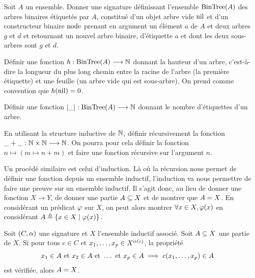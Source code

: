 \begin{exercise}
  Soit $A$ un ensemble. Donner une signature définissant l'ensemble
  $\operatorname{BinTree}(A)$ des arbres
  binaires étiquetés par $A$, constitué d'un objet arbre vide $\operatorname{nil}$ et d'un
  constructeur binaire $\operatorname{node}$ prenant en argument un élément $a$ de $A$
  et deux arbres $g$ et $d$ et retournant un nouvel arbre binaire, d'étiquette
  $a$ et dont les deux sous-arbres sont $g$ et $d$.

  Définir une fonction $h : \displaystyle \operatorname{BinTree}(A) \longrightarrow \mathbb N$ donnant la
  hauteur d'un arbre, c'est-à-dire la longueur du plus long chemin entre la
  racine de l'arbre (la première étiquette) et une feuille (un arbre vide qui
  est sous-arbre). On prend comme convention que $h(\operatorname{nil}) = 0$.

  Définir une fonction $\left\vert\mathord{\_}\right\vert : \displaystyle \operatorname{BinTree}(A) \longrightarrow \mathbb N$ donnant
  le nombre d'étiquettes d'un arbre.
\end{exercise}

\begin{exercise}
  En utilisant la structure inductive de $\mathbb N$, définir récursivement
  la fonction
  $\mathord{\_}+\mathord{\_} : \displaystyle \mathbb N \times \mathbb N \longrightarrow \mathbb N$. On pourra pour cela définir
  la fonction $n \mapsto (m \mapsto n + m)$ et faire une fonction récursive sur
  l'argument $n$.
\end{exercise}

Un procédé similaire est celui d'induction. Là où la récursion nous permet de
définir une fonction depuis un ensemble inductif, l'induction va nous permettre
de faire une preuve sur un ensemble inductif. Il s'agit donc, au lieu de donner
une fonction $X \to Y$, de donner une partie $A \subseteq X$ et de montrer
que $A = X$. En considérant un prédicat $\varphi$ sur $X$, on peut alors
montrer $\forall x \in X, \varphi(x)$ en considérant
$A\triangleq \left\{ x\in X \;\middle\vert\; \varphi(x) \right\}$.

\begin{theorem}\label{thm.ind.induct}
  Soit $(C,\alpha)$ une signature et $X$ l'ensemble inductif associé. Soit
  $A\subseteq X$ une partie de $X$. Si pour tous $c\in C$ et
  $x_1,\ldots,x_p\in X^{\alpha(c)}$, la propriété
  \[x_1\in A \text{ et } x_2\in A \text{ et }\ldots \text{ et }
  x_p\in A \implies c(x_1,\ldots,x_p)\in A\] est vérifiée,
  alors $A = X$.
\end{theorem}

